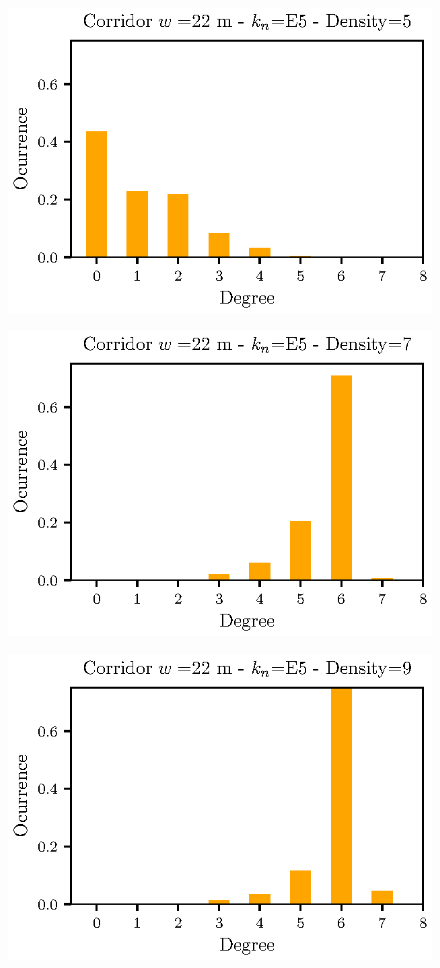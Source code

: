\documentclass[preprint,12pt]{elsarticle}
\begin{document}
\begin{figure}[htbp!]
\centering
\includegraphics[width=0.7\columnwidth]
{./histo_grado_density5_width22_knE5.eps}
\caption{\label{} }
\end{figure}


\begin{figure}[htbp!]
\centering
\includegraphics[width=0.7\columnwidth]
{./histo_grado_density7_width22_knE5.eps}
\caption{\label{} }
\end{figure}


\begin{figure}[htbp!]
\centering
\includegraphics[width=0.7\columnwidth]
{./histo_grado_density9_width22_knE5.eps}
\caption{\label{} }
\end{figure}
\end{document}
